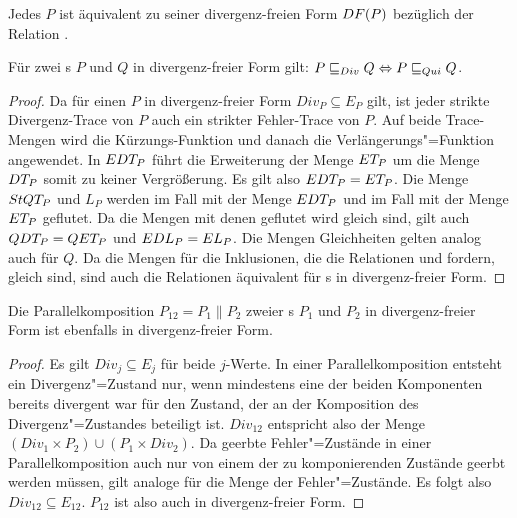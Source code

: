 \begin{Prop}
  \label{DivNormProp}
  Jedes \MEIO{} $P$ ist äquivalent zu seiner divergenz-freien Form $DF (P)$
  bezüglich der Relation \DRel{}.
\end{Prop}

\vspace{0.2cm}

\begin{Lem}
  Für zwei \MEIO{}s $P$ und $Q$ in divergenz-freier Form gilt: $P  \sqsubseteq  _{Div} Q
  \Leftrightarrow P  \sqsubseteq  _{Qui} Q$.
\end{Lem}
\begin{proof}
  Da für einen \MEIO{} $P$ in divergenz-freier Form $Div _P \subseteq E _P$
  gilt, ist jeder strikte Divergenz-Trace von $P$ auch ein strikter
  Fehler-Trace von $P$. Auf beide Trace-Mengen wird die Kürzungs-Funktion
  \prune{} und danach die Verlängerungs"=Funktion \cont{} angewendet. In $EDT
  _P$ führt die Erweiterung der Menge $ET _P$ um die Menge $DT _P$ somit zu
  keiner Vergrößerung. Es gilt also $EDT _P = ET _P$. Die Menge $StQT _P$
  und $L _P$ werden im Fall \DRel{} mit der Menge $EDT _P$ und im Fall \QRel{}
  mit der Menge $ET _P$ geflutet. Da die Mengen mit denen geflutet wird gleich
  sind, gilt auch $QDT _P = QET _P$ und $EDL _P = EL _P$. Die Mengen
  Gleichheiten gelten analog auch für $Q$. Da die Mengen für die Inklusionen,
  die die Relationen \DRel{} und \QRel{} fordern, gleich sind, sind auch die
  Relationen äquivalent für \MEIO{}s in divergenz-freier Form.
\end{proof}

\begin{Lem}
  \label{DivFreiParallelLem}
  Die Parallelkomposition $P_{12} = P_1\|P_2$ zweier \MEIO{}s $P_1$ und $P_2$
  in divergenz-freier Form ist ebenfalls in divergenz-freier Form.
\end{Lem}
\begin{proof}
  Es gilt $Div _j \subseteq E_j$ für beide $j$-Werte. In einer
  Parallelkomposition entsteht ein Divergenz"=Zustand nur, wenn mindestens
  eine der beiden Komponenten bereits divergent war für den Zustand, der an der
  Komposition des Divergenz"=Zustandes beteiligt ist. $Div _{12}$ entspricht
  also der Menge $(Div _1 \times P_2) \cup (P_1 \times Div _2)$. Da geerbte
  Fehler"=Zustände in einer Parallelkomposition auch nur von einem der zu
  komponierenden Zustände geerbt werden müssen, gilt analoge für die Menge der
  Fehler"=Zustände. Es folgt also $Div _{12} \subseteq E _{12}$. $P_{12}$ ist
  also auch in divergenz-freier Form.
\end{proof}

